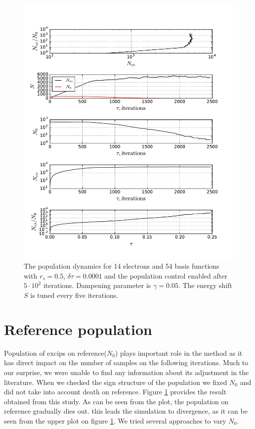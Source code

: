 \documentclass[twoside,english]{uiofysmaster}
\begin{document}
\begin{figure}[ht!]
	\centering
	\includegraphics[width=0.8\linewidth]{deathN0}
	\caption{The population dynamics for 14 electrons and 54 basis functions with $r_s=0.5$, $\delta \tau=0.0001$ and the population control enabled after $5\cdot 10^2$ iterations. Dampening parameter is $\gamma = 0.05$. The energy shift $S$ is tuned every five iterations.}
	\label{fig:deathN0}
\end{figure}

\section{Reference population}
Population of excips on reference($N_0$) plays important role in the method as it has direct impact on the number of samples on the following iterations. Much to our surprise, we were unable to find any information about its adjustment in the literature. When we checked the sign structure of the population we fixed $N_0$ and did not take into account death on reference. Figure \ref{fig:deathN0} provides the result obtained from this study. As can be seen from the plot, the population on reference gradually dies out. this leads the simulation to divergence, as it can be seen from the upper plot on figure \ref{fig:deathN0}.
We tried several approaches to vary $N_0$.
\end{document}

